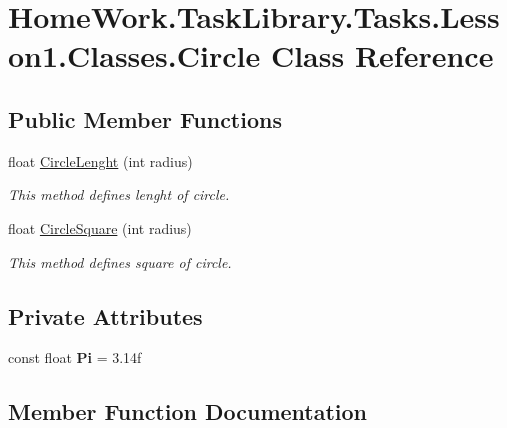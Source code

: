 \hypertarget{class_home_work_1_1_task_library_1_1_tasks_1_1_lesson1_1_1_classes_1_1_circle}{}\section{Home\+Work.\+Task\+Library.\+Tasks.\+Lesson1.\+Classes.\+Circle Class Reference}
\label{class_home_work_1_1_task_library_1_1_tasks_1_1_lesson1_1_1_classes_1_1_circle}
\subsection*{Public Member Functions}
\begin{DoxyCompactItemize}
\item 
float \mbox{\hyperlink{class_home_work_1_1_task_library_1_1_tasks_1_1_lesson1_1_1_classes_1_1_circle_a5d5356eaaa87bdbacd14af8cd068cf7a}{Circle\+Lenght}} (int radius)
\begin{DoxyCompactList}\small\item\em This method defines lenght of circle. \end{DoxyCompactList}\item 
float \mbox{\hyperlink{class_home_work_1_1_task_library_1_1_tasks_1_1_lesson1_1_1_classes_1_1_circle_af72a39cb5b4db04890a5f2e34fba920e}{Circle\+Square}} (int radius)
\begin{DoxyCompactList}\small\item\em This method defines square of circle. \end{DoxyCompactList}\end{DoxyCompactItemize}
\subsection*{Private Attributes}
\begin{DoxyCompactItemize}
\item 
\mbox{\label{class_home_work_1_1_task_library_1_1_tasks_1_1_lesson1_1_1_classes_1_1_circle_ada4ff96b8ccfce58f69dd7cf86dc1d2b}} 
const float {\bfseries Pi} = 3.\+14f
\end{DoxyCompactItemize}


\subsection{Member Function Documentation}
\mbox{\label{class_home_work_1_1_task_library_1_1_tasks_1_1_lesson1_1_1_classes_1_1_circle_a5d5356eaaa87bdbacd14af8cd068cf7a}} 
